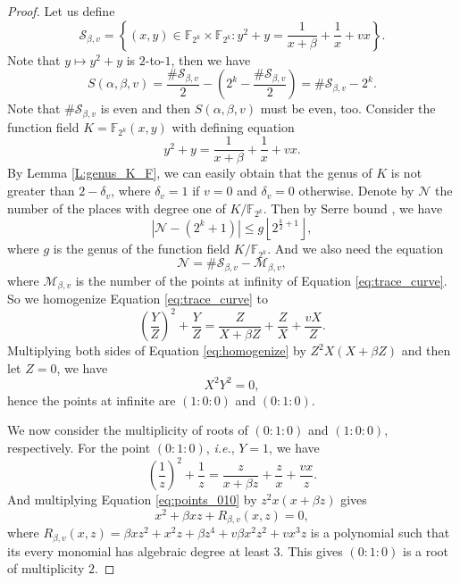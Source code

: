 \documentclass{article}
\newcommand{\F}{\mathbb{F}}
\newcommand{\0}{\textbf{0}}
\newcommand{\1}{\textbf{1}}
\theoremstyle{plain}
\begin{document}
\begin{proof}
        Let us define
        \[\mathcal{S}_{\beta,v}=\left\{(x,y)\in\F_{2^k}\times\F_{2^k} : y^2+y=\frac{1}{x+\beta}+\frac{1}{x}+vx\right\}.\]
        Note that $y\mapsto y^2+y$ is $2$-to-$1$, then we have
        \begin{equation}\label{eq:tracesum_S}
            S(\alpha,\beta,v)=\frac{\#\mathcal{S}_{\beta,v}}{2}-\left(2^k-\frac{\#\mathcal{S}_{\beta,v}}{2}\right)=\#\mathcal{S}_{\beta,v}-2^k.
        \end{equation}
        Note that $\#\mathcal{S}_{\beta,v}$ is even and then $S(\alpha,\beta,v)$ must be even, too.
        Consider the function field $K=\F_{2^k}(x,y)$ with defining equation
        \begin{equation}\label{eq:trace_curve}
            y^2+y=\frac{1}{x+\beta}+\frac{1}{x}+vx.
        \end{equation}
        By Lemma \ref{L:genus_K_F}, we can easily obtain that the genus of $K$ is not greater than $2-\delta_v$,
        where $\delta_v=1$ if $v=0$ and $\delta_v=0$ otherwise.
        Denote by $\mathcal{N}$ the number of the places with degree one of $K/\F_{2^k}$.
        Then by Serre bound \cite{Serre1982serrebound}, we have
        \begin{equation}\label{eq:N_genus_inequality}
            \left\lvert \mathcal{N}-(2^k+1)\right\rvert\le g\left\lfloor 2^{\frac{k}{2}+1}\right\rfloor,
        \end{equation}
        where $g$ is the genus of the function field $K/\F_{2^k}$.
        And we also need the equation
        \begin{equation}\label{eq:N_S_M_equality}
            \mathcal{N}=\#\mathcal{S}_{\beta,v}-\mathcal{M}_{\beta,v},
        \end{equation}
        where $\mathcal{M}_{\beta,v}$ is the number of the points at infinity of Equation \eqref{eq:trace_curve}.
        So we homogenize Equation \eqref{eq:trace_curve} to
        \begin{equation}\label{eq:homogenize}
            \left( \frac{Y}{Z} \right)^2+\frac{Y}{Z}=\frac{Z}{X+\beta Z}+\frac{Z}{X}+\frac{vX}{Z}.
        \end{equation}
        Multiplying both sides of Equation \eqref{eq:homogenize} by $Z^2X\left( X+\beta Z \right)$ and then let $Z=0$,
        we have
        \[X^2Y^2=0,\]
        hence the points at infinite are $(1:0:0)$ and $(0:1:0)$.

        We now consider the multiplicity of roots of $(0 : 1 : 0)$ and $(1 : 0 : 0)$, respectively.
        For the point $(0 : 1 : 0 )$, \emph{i.e.}, $Y = 1$, we have
        \begin{equation}\label{eq:points_010}
            \left( \frac{1}{z} \right)^2+\frac{1}{z}=\frac{z}{x+\beta z}+\frac{z}{x}+\frac{vx}{z}.
        \end{equation}
        And multiplying Equation \eqref{eq:points_010} by $z^2x(x+\beta z)$ gives
        \[x^2+\beta xz+R_{\beta,v}(x,z)=0,\]
        where $R_{\beta,v}(x,z)=\beta xz^2+x^2z+\beta z^4+v\beta x^2z^2+vx^3z$ is a polynomial
        such that its every monomial has algebraic degree at least $3$.
        This gives $(0 : 1 : 0)$ is a root of multiplicity $2$.


\end{proof}
\end{document}
